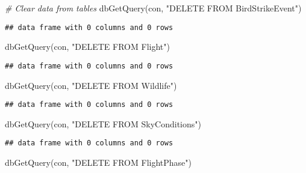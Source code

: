 \documentclass[
]{article}
\newenvironment{Shaded}{\begin{snugshade}}{\end{snugshade}}
\newcommand{\CommentTok}[1]{\textcolor[rgb]{0.56,0.35,0.01}{\textit{#1}}}
\newcommand{\FunctionTok}[1]{\textcolor[rgb]{0.00,0.00,0.00}{#1}}
\newcommand{\NormalTok}[1]{#1}
\newcommand{\StringTok}[1]{\textcolor[rgb]{0.31,0.60,0.02}{#1}}
\begin{document}
\begin{Shaded}
\begin{Highlighting}[]
\CommentTok{\# Clear data from tables}
\FunctionTok{dbGetQuery}\NormalTok{(con, }\StringTok{"DELETE FROM BirdStrikeEvent"}\NormalTok{)}
\end{Highlighting}
\end{Shaded}

\begin{verbatim}
## data frame with 0 columns and 0 rows
\end{verbatim}

\begin{Shaded}
\begin{Highlighting}[]
\FunctionTok{dbGetQuery}\NormalTok{(con, }\StringTok{"DELETE FROM Flight"}\NormalTok{)}
\end{Highlighting}
\end{Shaded}

\begin{verbatim}
## data frame with 0 columns and 0 rows
\end{verbatim}

\begin{Shaded}
\begin{Highlighting}[]
\FunctionTok{dbGetQuery}\NormalTok{(con, }\StringTok{"DELETE FROM Wildlife"}\NormalTok{)}
\end{Highlighting}
\end{Shaded}

\begin{verbatim}
## data frame with 0 columns and 0 rows
\end{verbatim}

\begin{Shaded}
\begin{Highlighting}[]
\FunctionTok{dbGetQuery}\NormalTok{(con, }\StringTok{"DELETE FROM SkyConditions"}\NormalTok{)}
\end{Highlighting}
\end{Shaded}

\begin{verbatim}
## data frame with 0 columns and 0 rows
\end{verbatim}

\begin{Shaded}
\begin{Highlighting}[]
\FunctionTok{dbGetQuery}\NormalTok{(con, }\StringTok{"DELETE FROM FlightPhase"}\NormalTok{)}
\end{Highlighting}
\end{Shaded}
\end{document}
